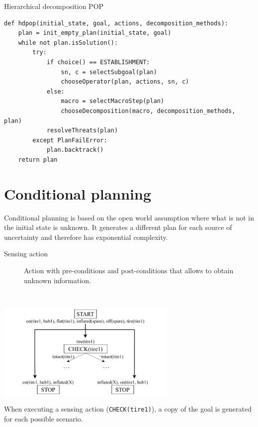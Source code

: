 \begin{algorithm}
\caption{Hierarchical decomposition POP}
\begin{lstlisting}[mathescape=true]
def hdpop(initial_state, goal, actions, decomposition_methods):
    plan = init_empty_plan(initial_state, goal)
    while not plan.isSolution():
        try:
            if choice() == ESTABLISHMENT:
                sn, c = selectSubgoal(plan)
                chooseOperator(plan, actions, sn, c)
            else:
                macro = selectMacroStep(plan)
                chooseDecomposition(macro, decomposition_methods, plan)
            resolveThreats(plan)
        except PlanFailError:
            plan.backtrack()
    return plan
\end{lstlisting}
\end{algorithm}



\section{Conditional planning}
Conditional planning is based on the open world assumption where what is not in the initial state is unknown.
It generates a different plan for each source of uncertainty and therefore has exponential complexity.

\begin{description}
    \item[Sensing action] 
        Action with pre-conditions and post-conditions that allows to obtain unknown information.
\end{description}


\begin{example}
    \phantom{}\\
    \begin{center}
        \includegraphics[width=0.65\textwidth]{img/_conditional_planning.pdf}
    \end{center}

    When executing a sensing action (\texttt{CHECK(tire1)}), a copy of the goal is generated for each possible scenario.
\end{example}



